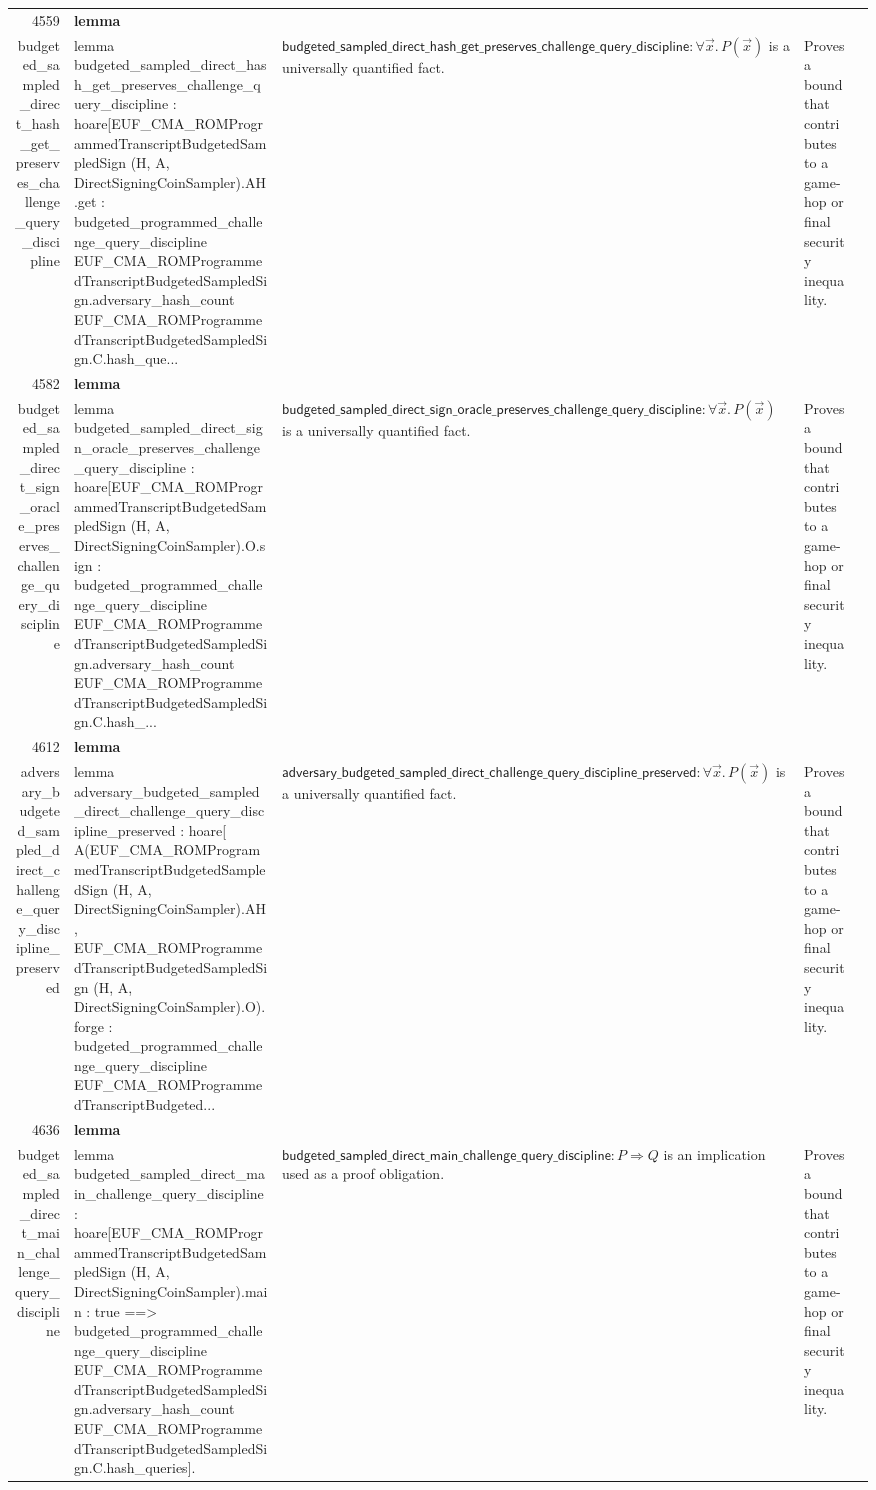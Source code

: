 \documentclass[10pt]{article}
\newcommand{\ec}[1]{\begingroup\ttfamily\scriptsize #1\endgroup}
\begin{document}
\begin{longtable}{r L{0.17\textwidth} L{0.26\textwidth} L{0.27\textwidth} L{0.20\textwidth}}
4559 & \textbf{lemma}\\\ec{budgeted\_sampled\_direct\_hash\_get\_preserves\_challenge\_query\_discipline} & \ec{lemma budgeted\_sampled\_direct\_hash\_get\_preserves\_challenge\_query\_discipline : hoare[EUF\_CMA\_ROMProgrammedTranscriptBudgetedSampledSign (H, A, DirectSigningCoinSampler).AH.get : budgeted\_programmed\_challenge\_query\_discipline EUF\_CMA\_ROMProgrammedTranscriptBudgetedSampledSign.adversary\_hash\_count EUF\_CMA\_ROMProgrammedTranscriptBudgetedSampledSign.C.hash\_que...} & \(\mathsf{budgeted\_sampled\_direct\_hash\_get\_preserves\_challenge\_query\_discipline} : \forall \vec{x}.\, P(\vec{x})\) is a universally quantified fact. & Proves a bound that contributes to a game-hop or final security inequality. \\
4582 & \textbf{lemma}\\\ec{budgeted\_sampled\_direct\_sign\_oracle\_preserves\_challenge\_query\_discipline} & \ec{lemma budgeted\_sampled\_direct\_sign\_oracle\_preserves\_challenge\_query\_discipline : hoare[EUF\_CMA\_ROMProgrammedTranscriptBudgetedSampledSign (H, A, DirectSigningCoinSampler).O.sign : budgeted\_programmed\_challenge\_query\_discipline EUF\_CMA\_ROMProgrammedTranscriptBudgetedSampledSign.adversary\_hash\_count EUF\_CMA\_ROMProgrammedTranscriptBudgetedSampledSign.C.hash\_...} & \(\mathsf{budgeted\_sampled\_direct\_sign\_oracle\_preserves\_challenge\_query\_discipline} : \forall \vec{x}.\, P(\vec{x})\) is a universally quantified fact. & Proves a bound that contributes to a game-hop or final security inequality. \\
4612 & \textbf{lemma}\\\ec{adversary\_budgeted\_sampled\_direct\_challenge\_query\_discipline\_preserved} & \ec{lemma adversary\_budgeted\_sampled\_direct\_challenge\_query\_discipline\_preserved : hoare[ A(EUF\_CMA\_ROMProgrammedTranscriptBudgetedSampledSign (H, A, DirectSigningCoinSampler).AH, EUF\_CMA\_ROMProgrammedTranscriptBudgetedSampledSign (H, A, DirectSigningCoinSampler).O).forge : budgeted\_programmed\_challenge\_query\_discipline EUF\_CMA\_ROMProgrammedTranscriptBudgeted...} & \(\mathsf{adversary\_budgeted\_sampled\_direct\_challenge\_query\_discipline\_preserved} : \forall \vec{x}.\, P(\vec{x})\) is a universally quantified fact. & Proves a bound that contributes to a game-hop or final security inequality. \\
4636 & \textbf{lemma}\\\ec{budgeted\_sampled\_direct\_main\_challenge\_query\_discipline} & \ec{lemma budgeted\_sampled\_direct\_main\_challenge\_query\_discipline : hoare[EUF\_CMA\_ROMProgrammedTranscriptBudgetedSampledSign (H, A, DirectSigningCoinSampler).main : true ==> budgeted\_programmed\_challenge\_query\_discipline EUF\_CMA\_ROMProgrammedTranscriptBudgetedSampledSign.adversary\_hash\_count EUF\_CMA\_ROMProgrammedTranscriptBudgetedSampledSign.C.hash\_queries].} & \(\mathsf{budgeted\_sampled\_direct\_main\_challenge\_query\_discipline} : P \Rightarrow Q\) is an implication used as a proof obligation. & Proves a bound that contributes to a game-hop or final security inequality. \\

\end{longtable}
\end{document}
